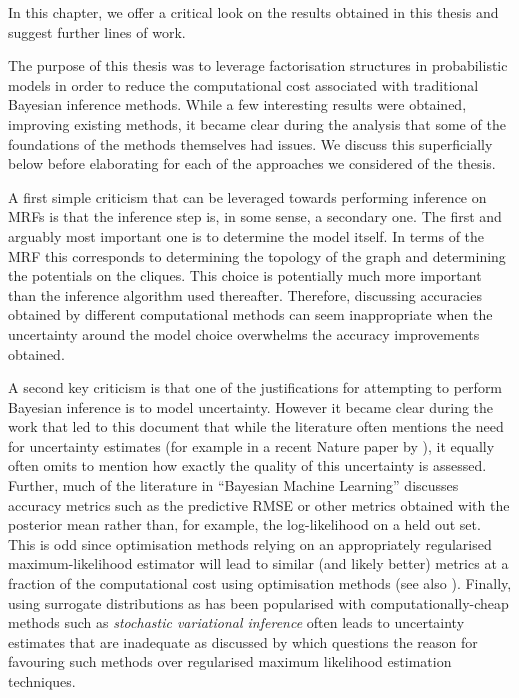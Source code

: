 
In this chapter, we offer a critical look on the results obtained in this thesis and suggest further lines of work.

The purpose of this thesis was to leverage factorisation structures in probabilistic models in order to reduce the computational cost associated with traditional Bayesian inference methods. While a few interesting results were obtained, improving existing methods, it became clear during the analysis that some of the foundations of the methods themselves had issues. We discuss this superficially below before elaborating for each of the approaches we considered of the thesis. 

A first simple criticism that can be leveraged towards performing inference on MRFs is that the inference step is, in some sense, a secondary one. The first and arguably most important one is to determine the model itself. In terms of the MRF this corresponds to determining the topology of the graph and determining the potentials on the cliques. This choice is potentially much more important than the inference algorithm used thereafter. Therefore, discussing accuracies obtained by different computational methods can seem inappropriate when the uncertainty around the model choice overwhelms the accuracy improvements obtained. 

A second key criticism is that one of the justifications for attempting to perform Bayesian inference is to model uncertainty. However it became clear during the work that led to this document that while the literature often mentions the need for uncertainty estimates (for example in a recent Nature paper by \citet{ghahramani15}), it equally often omits to mention how exactly the quality of this uncertainty is assessed. 
Further, much of the literature in ``Bayesian Machine Learning'' discusses accuracy metrics such as the predictive RMSE or other metrics obtained with the posterior mean rather than, for example, the log-likelihood on a held out set.
This is odd since optimisation methods relying on an appropriately regularised maximum-likelihood estimator will lead to similar (and likely better) metrics at a fraction of the computational cost using optimisation methods (see also \citet{green15}). %
Finally, using surrogate distributions as has been popularised with computationally-cheap methods such as \emph{stochastic variational inference} \citep{hoffman13} often leads to uncertainty estimates that are inadequate as discussed by \cite{wang05} which questions the reason for favouring such methods over regularised maximum likelihood estimation techniques.

